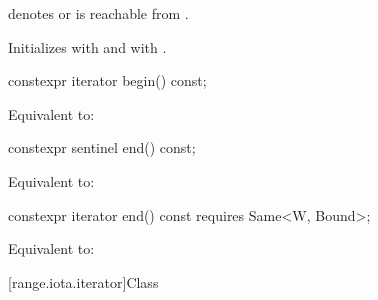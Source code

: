 \begin{itemdescr}
\pnum
\expects
{} denotes  or
 is reachable from .

\pnum
\effects Initializes  with  and
 with .
\end{itemdescr}

%
\begin{itemdecl}
constexpr iterator begin() const;
\end{itemdecl}

\begin{itemdescr}
\pnum
\effects Equivalent to: 
\end{itemdescr}

%
\begin{itemdecl}
constexpr sentinel end() const;
\end{itemdecl}

\begin{itemdescr}
\pnum
\effects Equivalent to: 
\end{itemdescr}

%
\begin{itemdecl}
constexpr iterator end() const requires Same<W, Bound>;
\end{itemdecl}

\begin{itemdescr}
\pnum
\effects Equivalent to: 
\end{itemdescr}

[range.iota.iterator]{Class }

